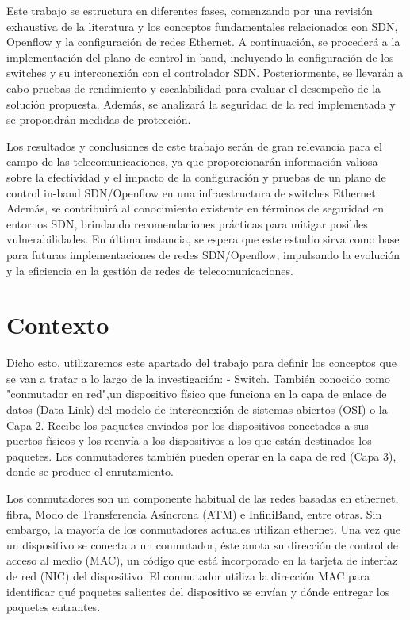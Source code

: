 \documentclass[a4paper, 12pt]{book}
\begin{document}
	Este trabajo se estructura en diferentes fases, comenzando por una revisión exhaustiva de la literatura y los conceptos fundamentales relacionados con SDN, Openflow y la configuración de redes Ethernet. A continuación, se procederá a la implementación del plano de control in-band, incluyendo la configuración de los switches y su interconexión con el controlador SDN. Posteriormente, se llevarán a cabo pruebas de rendimiento y escalabilidad para evaluar el desempeño de la solución propuesta. Además, se analizará la seguridad de la red implementada y se propondrán medidas de protección.
	
	Los resultados y conclusiones de este trabajo serán de gran relevancia para el campo de las telecomunicaciones, ya que proporcionarán información valiosa sobre la efectividad y el impacto de la configuración y pruebas de un plano de control in-band SDN/Openflow en una infraestructura de switches Ethernet. Además, se contribuirá al conocimiento existente en términos de seguridad en entornos SDN, brindando recomendaciones prácticas para mitigar posibles vulnerabilidades. En última instancia, se espera que este estudio sirva como base para futuras implementaciones de redes SDN/Openflow, impulsando la evolución y la eficiencia en la gestión de redes de telecomunicaciones.
	
	\section{Contexto}
	\label{chap:estado}
	Dicho esto, utilizaremos este apartado del trabajo para definir los conceptos que se van a tratar a lo largo de la investigación:
	- Switch. También conocido como "conmutador en red",un dispositivo físico que funciona en la capa de enlace de datos (Data Link) del modelo de interconexión de sistemas abiertos (OSI) o la Capa 2. Recibe los paquetes enviados por los dispositivos conectados a sus puertos físicos y los reenvía a los dispositivos a los que están destinados los paquetes. Los conmutadores también pueden operar en la capa de red (Capa 3), donde se produce el enrutamiento.
	
	Los conmutadores son un componente habitual de las redes basadas en ethernet, fibra, Modo de Transferencia Asíncrona (ATM) e InfiniBand, entre otras. Sin embargo, la mayoría de los conmutadores actuales utilizan ethernet. Una vez que un dispositivo se conecta a un conmutador, éste anota su dirección de control de acceso al medio (MAC), un código que está incorporado en la tarjeta de interfaz de red (NIC) del dispositivo. El conmutador utiliza la dirección MAC para identificar qué paquetes salientes del dispositivo se envían y dónde entregar los paquetes entrantes.
	
\end{document}
